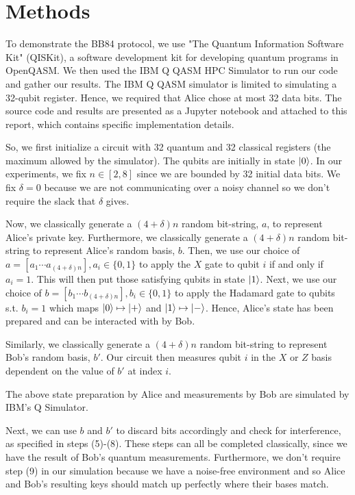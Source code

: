 \documentclass[12]{amsart}
\begin{document}
\section{Methods}

To demonstrate the BB84 protocol, we use "The Quantum Information Software Kit" (QISKit), a software development kit for developing quantum programs in OpenQASM. We then used the IBM Q QASM HPC Simulator to run our code and gather our results. The IBM Q QASM simulator is limited to simulating a 32-qubit register. Hence, we required that Alice chose at most 32 data bits. The source code and results are presented as a Jupyter notebook and attached to this report, which contains specific implementation details. 

So, we first initialize a circuit with 32 quantum and 32 classical registers (the maximum allowed by the simulator). The qubits are initially in state $\ket{0}$. In our experiments, we fix $n \in [2, 8]$ since we are bounded by 32 initial data bits. We fix $\delta = 0$ because we are not communicating over a noisy channel so we don't require the slack that $\delta$ gives.

Now, we classically generate a $(4 + \delta) n$ random bit-string, $a$, to represent Alice's private key. Furthermore, we classically generate a $(4 + \delta) n$ random bit-string to represent Alice's random basis, $b$. Then, we use our choice of $a = [a_1 \cdots a_{(4 + \delta) n}], a_i \in \{ 0, 1\}$ to apply the $X$ gate to qubit $i$ if and only if $a_i = 1$. This will then put those satisfying qubits in state $\ket{1}$. Next, we use our choice of $b = [b_1 \cdots b_{(4 + \delta) n}], b_i \in \{ 0, 1\}$ to apply the Hadamard gate to qubits s.t. $b_i = 1$ which maps $\ket{0} \mapsto \ket{+}$ and $\ket{1} \mapsto \ket{-}$. Hence, Alice's state has been prepared and can be interacted with by Bob. 

Similarly, we classically generate a $(4 + \delta) n$ random bit-string to represent Bob's random basis, $b'$. Our circuit then measures qubit $i$ in the $X$ or $Z$ basis dependent on the value of $b'$ at index $i$. 

The above state preparation by Alice and measurements by Bob are simulated by IBM's Q Simulator.

Next, we can use $b$ and $b'$ to discard bits accordingly and check for interference, as specified in steps (5)-(8). These steps can all be completed classically, since we have the result of Bob's quantum measurements. Furthermore, we don't require step (9) in our simulation because we have a noise-free environment and so Alice and Bob's resulting keys should match up perfectly where their bases match. 
\end{document}
